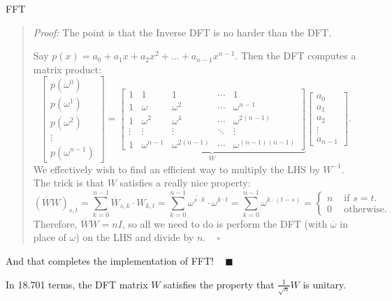 \begin{solution}{FFT}
\begin{quote}
        \emph{Proof:} The point is that the Inverse DFT is no harder than the DFT.

        Say $p(x) = a_0 + a_1x + a_2x^2 + \dots + a_{n - 1}x^{n - 1}$.  Then the DFT computes a matrix product:
        \[ \begin{bmatrix} p(\omega^0) \\ p(\omega^1) \\ p(\omega^2) \\ \vdots \\ p(\omega^{n - 1}) \end{bmatrix}
        = \underbrace{\begin{bmatrix} 1 & 1 & 1 & \cdots & 1 \\ 1 & \omega & \omega^2 & \cdots & \omega^{n - 1} \\ 1 & \omega^2 & \omega^4 & \cdots & \omega^{2(n - 1)} \\ \vdots & \vdots & \vdots & \ddots & \vdots \\ 1 & \omega^{n - 1} & \omega^{2(n - 1)} & \cdots & \omega^{(n - 1)(n - 1)} \end{bmatrix}}_{W} \begin{bmatrix} a_0 \\ a_1 \\ a_2 \\ \vdots \\ a_{n - 1} \end{bmatrix}. \]
        We effectively wish to find an efficient way to multiply the LHS by $W^{-1}$.  The trick is that $W$ satisfies a really nice property:
        \[ \left(\overline{W} W\right)_{s, t} = \sum_{k = 0}^{n - 1} \overline{W}_{s, k} \cdot W_{k, t} = \sum_{k = 0}^{n - 1} \overline{\omega^{s \cdot k}} \cdot \omega^{k \cdot t} = \sum_{k = 0}^{n - 1} \omega^{k \cdot (t - s)} = \begin{cases} n & \text{ if } s = t. \\
            0 & \text{ otherwise.} \end{cases} \]
        Therefore, $\overline{W}W = nI$, so all we need to do is perform the DFT (with $\overline{\omega}$ in place of $\omega$) on the LHS and divide by $n$. ~ $\square$
    \end{quote}
    And that completes the implementation of FFT! ~ $\blacksquare$
\end{solution}

\begin{remark}
    In 18.701 terms, the DFT matrix $W$ satisfies the property that $\frac{1}{\sqrt{n}}W$ is unitary.
\end{remark}

